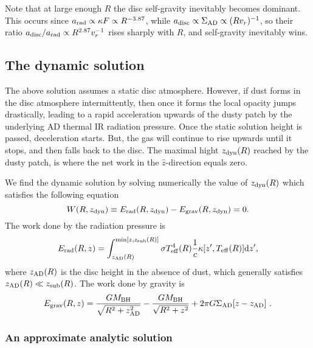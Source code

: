\documentclass[a4paper,fleqn,usenatbib]{mnras}
\newcommand{\dd}{\textrm{d}}
\begin{document}
Note that at large enough $R$ the disc self-gravity inevitably becomes dominant. 
This occurs since $a_{\rm rad}\propto \kappa F\propto R^{-3.87}$, while $a_{\rm disc}\propto 
\Sigma_{\rm AD} \propto (Rv_r)^{-1}$, so their ratio 
$a_{\rm disc}/a_{\rm rad}\propto R^{2.87} v_r^{-1}$ rises sharply with $R$, and self-gravity inevitably wins.

	
	
	
\subsection{The dynamic solution}\label{sec:dyn_model}
	
The above solution assumes a static disc atmosphere. However, if dust forms in the disc atmosphere intermittently, then once
it forms the local opacity jumps drastically, leading to a rapid acceleration upwards
of the dusty patch 
by the underlying AD thermal IR radiation pressure.
Once the static solution height is passed, deceleration starts. But, the gas will continue to
rise upwards until it stops, and then falls back to the disc.
The maximal hight $z_{\rm dyn}(R)$ reached by the dusty patch, is where the net work in the $\hat{z}$-direction equals zero. 
 
We find the dynamic solution by solving numerically the value of $z_{\rm dyn}(R)$ which satisfies 
the following equation
\begin{equation}
	W(R,z_{\rm dyn}) \equiv E_{\rm rad}(R,z_{\rm dyn}) - E_{\rm grav}(R,z_{\rm dyn}) = 0. \label{eq:work}
\end{equation}
The work done by the radiation pressure is
\begin{equation}
	E_{\rm rad}(R,z) = \int_{z_{\rm AD}(R)}^{\min[z,z_{\rm sub}(R)]} \sigma T_{\rm eff}^4(R)\frac{1}{c}\kappa[z^{\prime} ,T_{\rm eff}(R)]\dd z^{\prime} ,\label{eq:E_rad}
\end{equation}
where $z_{\rm AD}(R)$ is the disc height in the absence of dust, which generally satisfies 
$z_{\rm AD}(R)\ll z_{\rm sub}(R)$. The work done by gravity is
\begin{equation}
	E_{\rm grav}(R,z)  =  \frac{G M_{\rm BH}}{\sqrt{R^2+z_{\rm AD}^2}}-\frac{G M_{\rm BH}}
{\sqrt{R^2+z^2}} 
 + 
  2\pi G \Sigma_{\rm AD}[z-z_{\rm AD}]\ . 
\label{eq:E_grav}
\end{equation}
	

\subsubsection{An approximate analytic solution}
\end{document}
